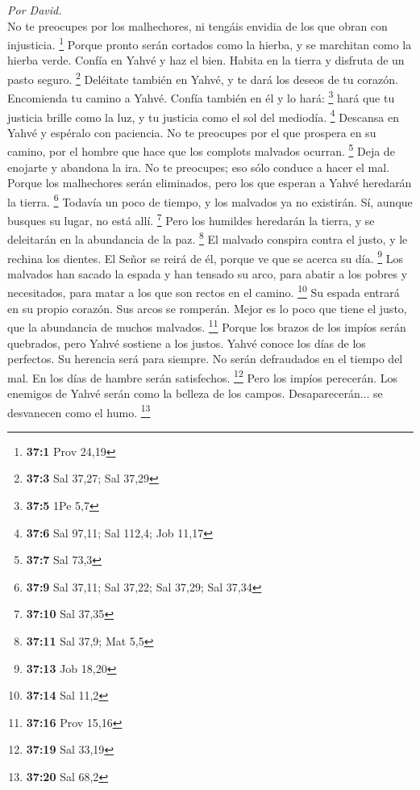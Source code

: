 \begin{paracol}{2}
\emph{Por David.}\\
 No te preocupes por los malhechores, ni tengáis envidia
de los que obran con injusticia. \footnote{\textbf{37:1} Prov 24,19}
 Porque pronto serán cortados como la hierba, y se
marchitan como la hierba verde.  Confía en Yahvé y haz el
bien. Habita en la tierra y disfruta de un pasto seguro. \footnote{\textbf{37:3}
  Sal 37,27; Sal 37,29}  Deléitate también en Yahvé, y te
dará los deseos de tu corazón.  Encomienda tu camino a
Yahvé. Confía también en él y lo hará: \footnote{\textbf{37:5} 1Pe 5,7}
 hará que tu justicia brille como la luz, y tu justicia
como el sol del mediodía. \footnote{\textbf{37:6} Sal 97,11; Sal 112,4;
  Job 11,17}  Descansa en Yahvé y espéralo con paciencia.
No te preocupes por el que prospera en su camino, por el hombre que hace
que los complots malvados ocurran. \footnote{\textbf{37:7} Sal 73,3}
 Deja de enojarte y abandona la ira. No te preocupes; eso
sólo conduce a hacer el mal.  Porque los malhechores serán
eliminados, pero los que esperan a Yahvé heredarán la tierra.
\footnote{\textbf{37:9} Sal 37,11; Sal 37,22; Sal 37,29; Sal 37,34}
 Todavía un poco de tiempo, y los malvados ya no
existirán. Sí, aunque busques su lugar, no está allí. \footnote{\textbf{37:10}
  Sal 37,35}  Pero los humildes heredarán la tierra, y se
deleitarán en la abundancia de la paz. \footnote{\textbf{37:11} Sal
  37,9; Mat 5,5}  El malvado conspira contra el justo, y
le rechina los dientes.  El Señor se reirá de él, porque
ve que se acerca su día. \footnote{\textbf{37:13} Job 18,20}
 Los malvados han sacado la espada y han tensado su arco,
para abatir a los pobres y necesitados, para matar a los que son rectos
en el camino. \footnote{\textbf{37:14} Sal 11,2}  Su
espada entrará en su propio corazón. Sus arcos se romperán.
 Mejor es lo poco que tiene el justo, que la abundancia
de muchos malvados. \footnote{\textbf{37:16} Prov 15,16} 
Porque los brazos de los impíos serán quebrados, pero Yahvé sostiene a
los justos.  Yahvé conoce los días de los perfectos. Su
herencia será para siempre.  No serán defraudados en el
tiempo del mal. En los días de hambre serán satisfechos. \footnote{\textbf{37:19}
  Sal 33,19}  Pero los impíos perecerán. Los enemigos de
Yahvé serán como la belleza de los campos. Desaparecerán... se
desvanecen como el humo. \footnote{\textbf{37:20} Sal 68,2}

\end{paracol}
